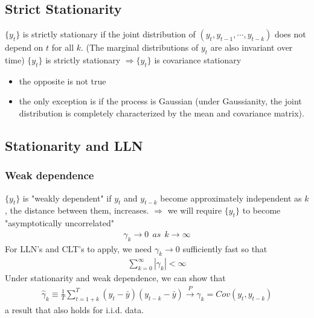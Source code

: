 \documentclass[a4paper,twoside,11pt]{article}
\begin{document}
\subsection{Strict Stationarity}
\noindent $\{y_t\}$ is strictly stationary if the joint distribution of $(y_t, y_{t-1},\cdots, y_{t-k})$ does not depend on $t$ for all $k$. (The marginal distributions of $y_t$ are also invariant over time)
\newline
$\{y_t\}$ is strictly stationary $\Rightarrow \{y_t\}$ is covariance stationary
\begin{itemize}
    \item the opposite is not true
    \item the only exception is if the process is Gaussian (under Gaussianity, the joint distribution is completely characterized by the mean and covariance matrix).
\end{itemize}
\subsection{Stationarity and LLN}
\subsubsection{Weak dependence}
\noindent $\{y_t\}$ is "weakly dependent" if $y_t$ and $y_{t-k}$ become approximately independent as $k$, the distance between them, increases.
\newline
$\Rightarrow$ we will require $\{y_t\}$ to become "asymptotically uncorrelated"
\begin{equation*}
\begin{aligned}
\gamma_k \rightarrow 0 \ \ as \ \ k \rightarrow \infty
\end{aligned}
\end{equation*}
\textcolor{NavyBlue}{For LLN's and CLT's to apply, we need $\gamma_k \rightarrow 0$ sufficiently fast so that}
\begin{equation*}
\begin{aligned}
\sum^\infty_{k=0} |\gamma_k| < \infty
\end{aligned}
\end{equation*}
\textcolor{NavyBlue}{Under stationarity and weak dependence, we can show that}
\begin{equation*}
\begin{aligned}
\hat \gamma_k \equiv \frac{1}{T} \sum^T_{t=1+k}(y_t - \bar y)(y_{t-k} - \bar y) \overset{P}{\rightarrow} \gamma_k = Cov(y_t, y_{t-k})
\end{aligned}
\end{equation*}
a result that also holds for i.i.d. data.
\end{document}
